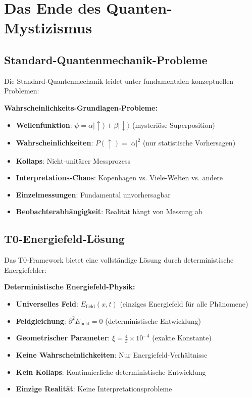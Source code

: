 \documentclass[12pt,a4paper]{report}
\begin{document}
\section{Das Ende des Quanten-Mystizismus}
\label{sec:end_quantum_mysticism}

\subsection{Standard-Quantenmechanik-Probleme}
\label{subsec:standard_qm_problems}

Die Standard-Quantenmechanik leidet unter fundamentalen konzeptuellen Problemen:

\begin{tcolorbox}[colback=red!5!white,colframe=red!75!black,title=Standard-QM-Probleme]
	\textbf{Wahrscheinlichkeits-Grundlagen-Probleme:}
	\begin{itemize}
		\item \textbf{Wellenfunktion}: $\psi = \alpha|\uparrow\rangle + \beta|\downarrow\rangle$ (mysteriöse Superposition)
		\item \textbf{Wahrscheinlichkeiten}: $P(\uparrow) = |\alpha|^2$ (nur statistische Vorhersagen)
		\item \textbf{Kollaps}: Nicht-unitärer Messprozess
		\item \textbf{Interpretations-Chaos}: Kopenhagen vs. Viele-Welten vs. andere
		\item \textbf{Einzelmessungen}: Fundamental unvorhersagbar
		\item \textbf{Beobachterabhängigkeit}: Realität hängt von Messung ab
	\end{itemize}
\end{tcolorbox}

\subsection{T0-Energiefeld-Lösung}
\label{subsec:t0_solution}

Das T0-Framework bietet eine vollständige Lösung durch deterministische Energiefelder:

\begin{tcolorbox}[colback=blue!5!white,colframe=blue!75!black,title=T0-Deterministische Grundlage]
	\textbf{Deterministische Energiefeld-Physik:}
	\begin{itemize}
		\item \textbf{Universelles Feld}: $E_{\text{field}}(x,t)$ (einziges Energiefeld für alle Phänomene)
		\item \textbf{Feldgleichung}: $\partial^2 E_{\text{field}} = 0$ (deterministische Entwicklung)
		\item \textbf{Geometrischer Parameter}: $\xi = \frac{4}{3} \times 10^{-4}$ (exakte Konstante)
		\item \textbf{Keine Wahrscheinlichkeiten}: Nur Energiefeld-Verhältnisse
		\item \textbf{Kein Kollaps}: Kontinuierliche deterministische Entwicklung
		\item \textbf{Einzige Realität}: Keine Interpretationsprobleme
	\end{itemize}
\end{tcolorbox}
\end{document}
